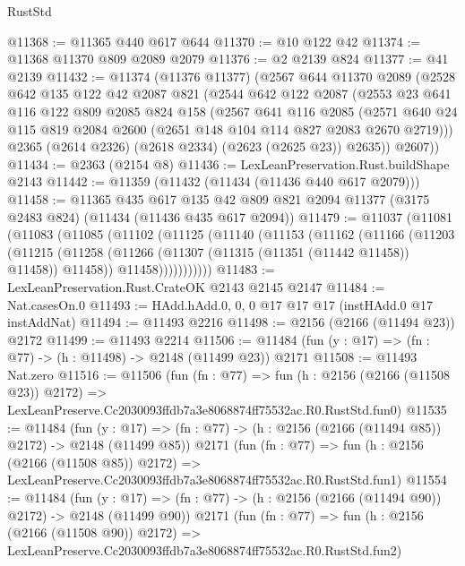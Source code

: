 \begin{lexlean}{RustStd}
\begin{coremodule}
@11368 := @11365 @440 @617 @644
@11370 := @10 @122 @42
@11374 := @11368 @11370 @809 @2089 @2079
@11376 := @2 @2139 @824
@11377 := @41 @2139
@11432 := @11374
    (@11376 @11377)
    (@2567
      @644
      @11370
      @2089
      (@2528
        @642
        @135
        @122
        @42
        @2087
        @821
        (@2544
          @642
          @122
          @2087
          (@2553
            @23
            @641
            @116
            @122
            @809
            @2085
            @824
            @158
            (@2567
              @641
              @116
              @2085
              (@2571 @640 @24 @115 @819 @2084 @2600 (@2651 @148 @104 @114 @827 @2083 @2670 @2719)))
            @2365
            (@2614 @2326)
            (@2618 @2334)
            (@2623 (@2625 @23))
            @2635))
        @2607))
@11434 := @2363 (@2154 @8)
@11436 := LexLeanPreservation.Rust.buildShape @2143
@11442 := @11359 (@11432 (@11434 (@11436 @440 @617 @2079)))
@11458 := @11365
    @435
    @617
    @135
    @42
    @809
    @821
    @2094
    @11377
    (@3175 @2483 @824)
    (@11434 (@11436 @435 @617 @2094))
@11479 := @11037
    (@11081
      (@11083
        (@11085
          (@11102
            (@11125
              (@11140
                (@11153
                  (@11162
                    (@11166
                      (@11203
                        (@11215
                          (@11258 (@11266 (@11307 (@11315 (@11351 (@11442 @11458)) @11458)) @11458))
                          @11458)))))))))))
@11483 := LexLeanPreservation.Rust.CrateOK @2143 @2145 @2147
@11484 := Nat.casesOn.{0}
@11493 := HAdd.hAdd.{0, 0, 0} @17 @17 @17 (instHAdd.{0} @17 instAddNat)
@11494 := @11493 @2216
@11498 := @2156 (@2166 (@11494 @23)) @2172
@11499 := @11493 @2214
@11506 := @11484 (fun (y : @17) => (fn : @77) -> (h : @11498) -> @2148 (@11499 @23)) @2171
@11508 := @11493 Nat.zero
@11516 := @11506
    (fun (fn : @77) =>
    fun (h : @2156 (@2166 (@11508 @23)) @2172) =>
    LexLeanPreserve.Cc2030093ffdb7a3e8068874ff75532ac.R0.RustStd.fun0)
@11535 := @11484
    (fun (y : @17) => (fn : @77) -> (h : @2156 (@2166 (@11494 @85)) @2172) -> @2148 (@11499 @85))
    @2171
    (fun (fn : @77) =>
    fun (h : @2156 (@2166 (@11508 @85)) @2172) =>
    LexLeanPreserve.Cc2030093ffdb7a3e8068874ff75532ac.R0.RustStd.fun1)
@11554 := @11484
    (fun (y : @17) => (fn : @77) -> (h : @2156 (@2166 (@11494 @90)) @2172) -> @2148 (@11499 @90))
    @2171
    (fun (fn : @77) =>
    fun (h : @2156 (@2166 (@11508 @90)) @2172) =>
    LexLeanPreserve.Cc2030093ffdb7a3e8068874ff75532ac.R0.RustStd.fun2)

\end{coremodule}
\end{lexlean}
